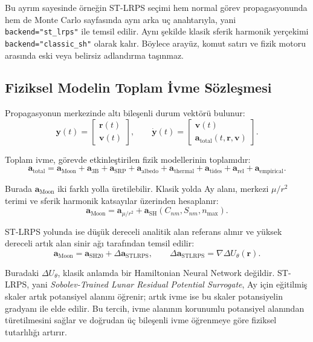 Bu ayrım sayesinde örneğin ST-LRPS seçimi hem normal görev propagasyonunda hem de Monte Carlo sayfasında aynı arka uç anahtarıyla, yani \texttt{backend="st\_lrps"} ile temsil edilir. Aynı şekilde klasik sferik harmonik yerçekimi \texttt{backend="classic\_sh"} olarak kalır. Böylece arayüz, komut satırı ve fizik motoru arasında eski veya belirsiz adlandırma taşınmaz.

\subsection{Fiziksel Modelin Toplam İvme Sözleşmesi}

Propagasyonun merkezinde altı bileşenli durum vektörü bulunur:
\[
\mathbf{y}(t)=
\begin{bmatrix}
\mathbf{r}(t)\\
\mathbf{v}(t)
\end{bmatrix},
\qquad
\dot{\mathbf{y}}(t)=
\begin{bmatrix}
\mathbf{v}(t)\\
\mathbf{a}_{\mathrm{total}}(t,\mathbf{r},\mathbf{v})
\end{bmatrix}.
\]

Toplam ivme, görevde etkinleştirilen fizik modellerinin toplamıdır:
\[
\mathbf{a}_{\mathrm{total}}
=
\mathbf{a}_{\mathrm{Moon}}
+ \mathbf{a}_{\mathrm{3B}}
+ \mathbf{a}_{\mathrm{SRP}}
+ \mathbf{a}_{\mathrm{albedo}}
+ \mathbf{a}_{\mathrm{thermal}}
+ \mathbf{a}_{\mathrm{tides}}
+ \mathbf{a}_{\mathrm{rel}}
+ \mathbf{a}_{\mathrm{empirical}}.
\]

Burada \(\mathbf{a}_{\mathrm{Moon}}\) iki farklı yolla üretilebilir. Klasik yolda Ay alanı, merkezi \(\mu/r^2\) terimi ve sferik harmonik katsayılar üzerinden hesaplanır:
\[
\mathbf{a}_{\mathrm{Moon}}
=
\mathbf{a}_{\mu/r^2}
+ \mathbf{a}_{\mathrm{SH}}(C_{nm},S_{nm},n_{\max}).
\]

ST-LRPS yolunda ise düşük dereceli analitik alan referans alınır ve yüksek dereceli artık alan sinir ağı tarafından temsil edilir:
\[
\mathbf{a}_{\mathrm{Moon}}
=
\mathbf{a}_{\mathrm{SH20}}
+ \Delta\mathbf{a}_{\mathrm{STLRPS}},
\qquad
\Delta\mathbf{a}_{\mathrm{STLRPS}}
=
\nabla \Delta U_{\theta}(\mathbf{r}).
\]

Buradaki \(\Delta U_{\theta}\), klasik anlamda bir Hamiltonian Neural Network değildir. ST-LRPS, yani \textit{Sobolev-Trained Lunar Residual Potential Surrogate}, Ay için eğitilmiş skaler artık potansiyel alanını öğrenir; artık ivme ise bu skaler potansiyelin gradyanı ile elde edilir. Bu tercih, ivme alanının korunumlu potansiyel alanından türetilmesini sağlar ve doğrudan üç bileşenli ivme öğrenmeye göre fiziksel tutarlılığı artırır.

